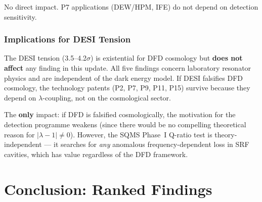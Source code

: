\documentclass[11pt]{article}
\theoremstyle{definition}
\theoremstyle{remark}
\begin{document}
No direct impact. P7 applications (DEW/HPM, IFE) do not depend on
detection sensitivity.


\section{Implications for DESI Tension}

The DESI tension (3.5--4.2$\sigma$) is existential for DFD cosmology
but \textbf{does not affect} any finding in this update. All five
findings concern laboratory resonator physics and are independent
of the dark energy model. If DESI falsifies DFD cosmology, the
technology patents (P2, P7, P9, P11, P15) survive because they depend
on $\lambda$-coupling, not on the cosmological sector.

The \textbf{only} impact: if DFD is falsified cosmologically, the
motivation for the detection programme weakens (since there would
be no compelling theoretical reason for $|\lambda - 1| \neq 0$).
However, the SQMS Phase~I Q-ratio test is theory-independent ---
it searches for \emph{any} anomalous frequency-dependent loss in
SRF cavities, which has value regardless of the DFD framework.


\part{Conclusion: Ranked Findings}
\label{part:conclusion}
\end{document}
